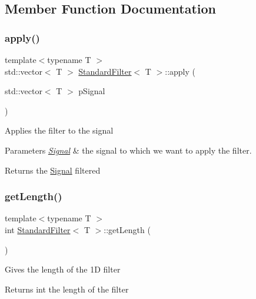 \subsection{Member Function Documentation}
\mbox{\label{class_standard_filter_a2b6a11ed970216b26bda63857d4ed1fc}} 
\subsubsection{\texorpdfstring{apply()}{apply()}}
{\footnotesize\ttfamily template$<$typename T $>$ \\
std\+::vector$<$ T $>$ \hyperlink{class_standard_filter}{Standard\+Filter}$<$ T $>$\+::apply (\begin{DoxyParamCaption}\item[{std\+::vector$<$ T $>$}]{p\+Signal }\end{DoxyParamCaption})}

Applies the filter to the signal 
\begin{DoxyParams}{Parameters}
{\em \hyperlink{class_signal}{Signal}} & the signal to which we want to apply the filter. \\
\hline
\end{DoxyParams}
\begin{DoxyReturn}{Returns}
the \hyperlink{class_signal}{Signal} filtered 
\end{DoxyReturn}
\mbox{\label{class_standard_filter_ae993492384d41dc26c5f5577607b3b02}} 
\subsubsection{\texorpdfstring{get\+Length()}{getLength()}}
{\footnotesize\ttfamily template$<$typename T $>$ \\
int \hyperlink{class_standard_filter}{Standard\+Filter}$<$ T $>$\+::get\+Length (\begin{DoxyParamCaption}{ }\end{DoxyParamCaption})}

Gives the length of the 1D filter \begin{DoxyReturn}{Returns}
int the length of the filter 
\end{DoxyReturn}
\mbox{\label{class_standard_filter_ab511fb0167d038d75cba52dd936eddd3}} 
